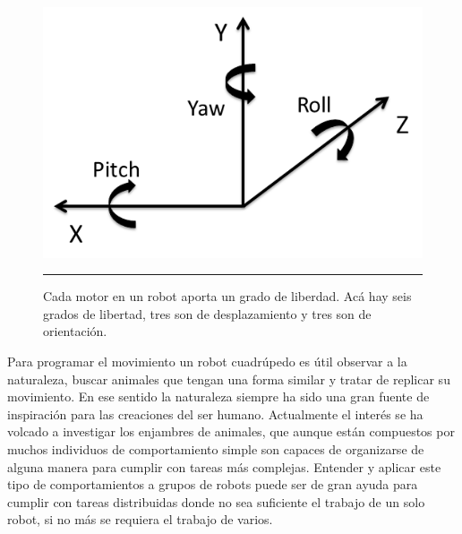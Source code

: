 \begin{figure}[htbp]
	\centering
		\includegraphics[width=\textwidth]{./Figures/6DOF.png}
		\rule{35em}{0.5pt}
	\caption[Grados de libertad]{Cada motor en un robot aporta un grado de liberdad. Acá hay seis grados de libertad, tres son de desplazamiento y tres son de orientación.}
	\label{fig:grados de libertad}
\end{figure}

Para programar el movimiento un robot cuadrúpedo es útil observar a la naturaleza, buscar animales que tengan una forma similar y tratar de replicar su movimiento. En ese sentido la naturaleza siempre ha sido una gran fuente de inspiración para las creaciones del ser humano. Actualmente el interés se ha volcado a investigar los enjambres de animales, que aunque están compuestos por muchos individuos de comportamiento simple son capaces de organizarse de alguna manera para cumplir con tareas más complejas. Entender y aplicar este tipo de comportamientos a grupos de robots puede ser de gran ayuda para cumplir con tareas distribuidas donde no sea suficiente el trabajo de un solo robot, si no más se requiera el trabajo de varios.


